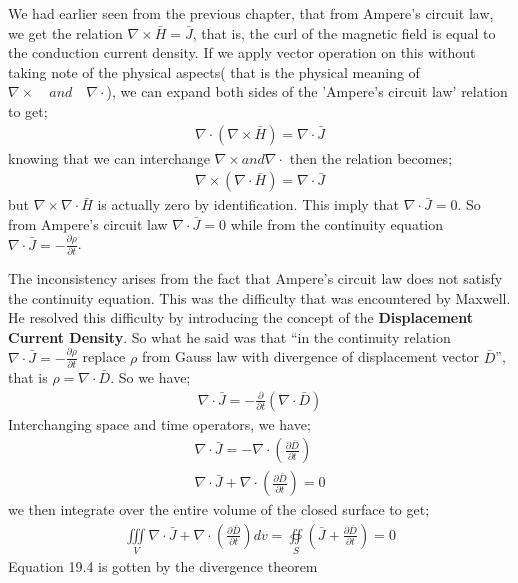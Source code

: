 We had earlier seen from the previous chapter, that from Ampere's circuit law, we get the relation $\nabla\times\bar{H}=\bar{J}$, that is, the curl of the magnetic field is equal to the conduction current density. If we apply vector operation on this without taking note of the physical aspects( that is the physical meaning of $\nabla\times\quad and\quad \nabla\cdot$), we can expand both sides of the 'Ampere's circuit law' relation to get;
\begin{align}
\nabla\cdot(\nabla\times\bar{H})=\nabla\cdot\bar{J}
\end{align}
knowing that we can interchange $\nabla\times and \nabla\cdot$ then the relation becomes;
\begin{align}
\nabla\times(\nabla\cdot\bar{H})=\nabla\cdot\bar{J}
\end{align}
but $\nabla\times\nabla\cdot\bar{H}$ is actually zero by identification. This imply that $\nabla\cdot\bar{J}=0$. So from Ampere's circuit law $\nabla\cdot\bar{J}=0$ while from the continuity equation $\nabla\cdot\bar{J}=-\frac{\partial\rho}{\partial t}$.

The inconsistency arises from the fact that Ampere's circuit law does not satisfy the continuity equation. This was the difficulty that was encountered by Maxwell. He resolved this difficulty by introducing the concept of the \textbf{Displacement Current Density}. So what he said was that \textquotedblleft in the continuity relation $\nabla\cdot\bar{J}=-\frac{\partial\rho}{\partial t}$ replace $\rho$ from Gauss law with divergence of displacement vector $\bar{D}$\textquotedblright, that is $\rho=\nabla\cdot\bar{D}$. So we have;
\begin{align}
\nabla\cdot\bar{J}=-\frac{\partial}{\partial t}(\nabla\cdot\bar{D})
\end{align}
Interchanging space and time operators, we have;
\begin{align}
\nabla\cdot\bar{J}=-\nabla\cdot(\frac{\partial\bar{D}}{\partial t})\\
\nabla\cdot\bar{J}+\nabla\cdot(\frac{\partial\bar{D}}{\partial t}) = 0
\end{align}
we then integrate over the entire volume of the closed surface to get;
\begin{align}
\iiint\limits_V\nabla\cdot\bar{J}+\nabla\cdot(\frac{\partial\bar{D}}{\partial t})dv=
\oiint\limits_S(\bar{J}+\frac{\partial\bar{D}}{\partial t})=0
\end{align}
Equation 19.4 is gotten by the divergence theorem

